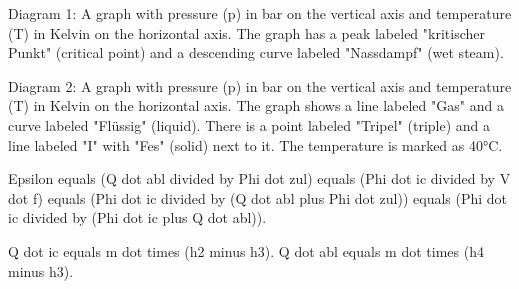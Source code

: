 Diagram 1: A graph with pressure (p) in bar on the vertical axis and temperature (T) in Kelvin on the horizontal axis. The graph has a peak labeled "kritischer Punkt" (critical point) and a descending curve labeled "Nassdampf" (wet steam).

Diagram 2: A graph with pressure (p) in bar on the vertical axis and temperature (T) in Kelvin on the horizontal axis. The graph shows a line labeled "Gas" and a curve labeled "Flüssig" (liquid). There is a point labeled "Tripel" (triple) and a line labeled "I" with "Fes" (solid) next to it. The temperature is marked as 40°C.

Epsilon equals (Q dot abl divided by Phi dot zul) equals (Phi dot ic divided by V dot f) equals (Phi dot ic divided by (Q dot abl plus Phi dot zul)) equals (Phi dot ic divided by (Phi dot ic plus Q dot abl)).  

Q dot ic equals m dot times (h2 minus h3).  
Q dot abl equals m dot times (h4 minus h3).